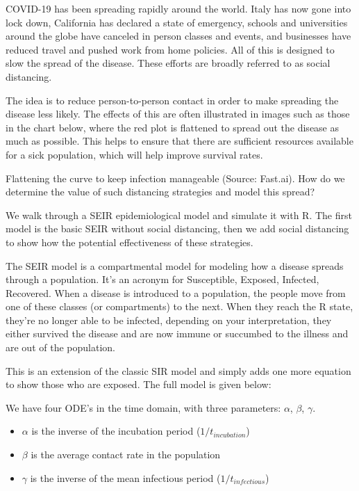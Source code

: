 \documentclass{article}\usepackage[]{graphicx}\usepackage[]{color}
\begin{document}
COVID-19 has been spreading rapidly around the world. Italy has now gone into lock down, California has declared a state of emergency, schools and universities around the globe have canceled in person classes and events, and businesses have reduced travel and pushed work from home policies. All of this is designed to slow the spread of the disease. These efforts are broadly referred to as social distancing.

The idea is to reduce person-to-person contact in order to make spreading the disease less likely. The effects of this are often illustrated in images such as those in the chart below, where the red plot is flattened to spread out the disease as much as possible. This helps to ensure that there are sufficient resources available for a sick population, which will help improve survival rates.

Flattening the curve to keep infection manageable (Source: Fast.ai).
How do we determine the value of such distancing strategies and model this spread?


We walk through a SEIR epidemiological model and simulate it with R. The first model is the basic SEIR without social distancing, then we add social distancing to show how the potential effectiveness of these strategies.

The SEIR model is a compartmental model for modeling how a disease spreads through a population. It's an acronym for Susceptible, Exposed, Infected, Recovered. When a disease is introduced to a population, the people move from one of these classes (or compartments) to the next. When they reach the R state, they’re no longer able to be infected, depending on your interpretation, they either survived the disease and are now immune or succumbed to the illness and are out of the population.

This is an extension of the classic SIR model and simply adds one more equation to show those who are exposed. The full model is given below:

We have four ODE's in the time domain, with three parameters: $\alpha$, $\beta$, $\gamma$.

\begin{itemize}

\item $\alpha$ is the inverse of the incubation period ($1/t_{incubation}$)
\item $\beta$ is the average contact rate in the population
\item $\gamma$ is the inverse of the mean infectious period ($1/t_{infectious}$)

\end{itemize}
\end{document}
